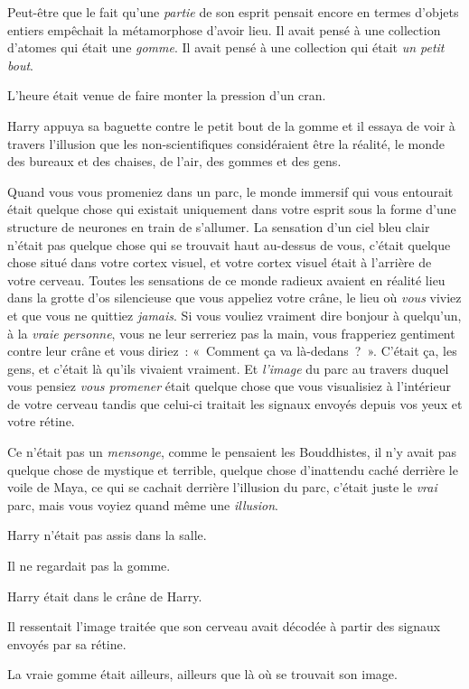 Peut-être que le fait qu'une \emph{partie} de son esprit pensait encore en termes d'objets entiers empêchait la métamorphose d'avoir lieu. Il avait pensé à une collection d'atomes qui était une \emph{gomme}. Il avait pensé à une collection qui était \emph{un petit bout}.

L'heure était venue de faire monter la pression d'un cran.

Harry appuya sa baguette contre le petit bout de la gomme et il essaya de voir à travers l'illusion que les non-scientifiques considéraient être la réalité, le monde des bureaux et des chaises, de l'air, des gommes et des gens.

Quand vous vous promeniez dans un parc, le monde immersif qui vous entourait était quelque chose qui existait uniquement dans votre esprit sous la forme d'une structure de neurones en train de s'allumer. La sensation d'un ciel bleu clair n'était pas quelque chose qui se trouvait haut au-dessus de vous, c'était quelque chose situé dans votre cortex visuel, et votre cortex visuel était à l'arrière de votre cerveau. Toutes les sensations de ce monde radieux avaient en réalité lieu dans la grotte d'os silencieuse que vous appeliez votre crâne, le lieu où \emph{vous} viviez et que vous ne quittiez \emph{jamais}. Si vous vouliez vraiment dire bonjour à quelqu'un, à la \emph{vraie personne}, vous ne leur serreriez pas la main, vous frapperiez gentiment contre leur crâne et vous diriez~: «~Comment ça va là-dedans~?~». C'était ça, les gens, et c'était là qu'ils vivaient vraiment. Et \emph{l'image} du parc au travers duquel vous pensiez \emph{vous promener} était quelque chose que vous visualisiez à l'intérieur de votre cerveau tandis que celui-ci traitait les signaux envoyés depuis vos yeux et votre rétine.

Ce n'était pas un \emph{mensonge}, comme le pensaient les Bouddhistes, il n'y avait pas quelque chose de mystique et terrible, quelque chose d'inattendu caché derrière le voile de Maya, ce qui se cachait derrière l'illusion du parc, c'était juste le \emph{vrai} parc, mais vous voyiez quand même une \emph{illusion}.

Harry n'était pas assis dans la salle.

Il ne regardait pas la gomme.

Harry était dans le crâne de Harry.

Il ressentait l'image traitée que son cerveau avait décodée à partir des signaux envoyés par sa rétine.

La vraie gomme était ailleurs, ailleurs que là où se trouvait son image.

